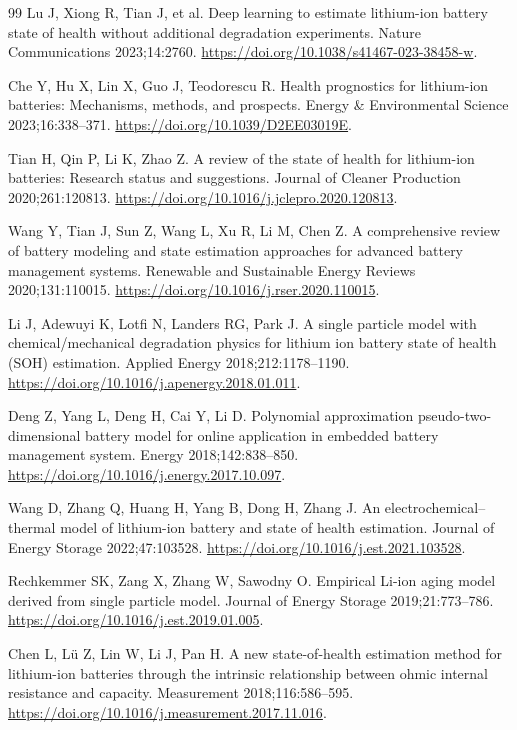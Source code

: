 \begin{thebibliography}{99}
 Lu J, Xiong R, Tian J, et al. Deep learning to estimate lithium-ion battery state of health without additional degradation experiments. Nature Communications 2023;14:2760. \url{https://doi.org/10.1038/s41467-023-38458-w}.

 Che Y, Hu X, Lin X, Guo J, Teodorescu R. Health prognostics for lithium-ion batteries: Mechanisms, methods, and prospects. Energy \& Environmental Science 2023;16:338–371. \url{https://doi.org/10.1039/D2EE03019E}.

 Tian H, Qin P, Li K, Zhao Z. A review of the state of health for lithium-ion batteries: Research status and suggestions. Journal of Cleaner Production 2020;261:120813. \url{https://doi.org/10.1016/j.jclepro.2020.120813}.

 Wang Y, Tian J, Sun Z, Wang L, Xu R, Li M, Chen Z. A comprehensive review of battery modeling and state estimation approaches for advanced battery management systems. Renewable and Sustainable Energy Reviews 2020;131:110015. \url{https://doi.org/10.1016/j.rser.2020.110015}.

 Li J, Adewuyi K, Lotfi N, Landers RG, Park J. A single particle model with chemical/mechanical degradation physics for lithium ion battery state of health (SOH) estimation. Applied Energy 2018;212:1178–1190. \url{https://doi.org/10.1016/j.apenergy.2018.01.011}.

 Deng Z, Yang L, Deng H, Cai Y, Li D. Polynomial approximation pseudo-two-dimensional battery model for online application in embedded battery management system. Energy 2018;142:838–850. \url{https://doi.org/10.1016/j.energy.2017.10.097}.

 Wang D, Zhang Q, Huang H, Yang B, Dong H, Zhang J. An electrochemical–thermal model of lithium-ion battery and state of health estimation. Journal of Energy Storage 2022;47:103528. \url{https://doi.org/10.1016/j.est.2021.103528}.

 Rechkemmer SK, Zang X, Zhang W, Sawodny O. Empirical Li-ion aging model derived from single particle model. Journal of Energy Storage 2019;21:773–786. \url{https://doi.org/10.1016/j.est.2019.01.005}.

 Chen L, Lü Z, Lin W, Li J, Pan H. A new state-of-health estimation method for lithium-ion batteries through the intrinsic relationship between ohmic internal resistance and capacity. Measurement 2018;116:586–595. \url{https://doi.org/10.1016/j.measurement.2017.11.016}.


\end{thebibliography}
